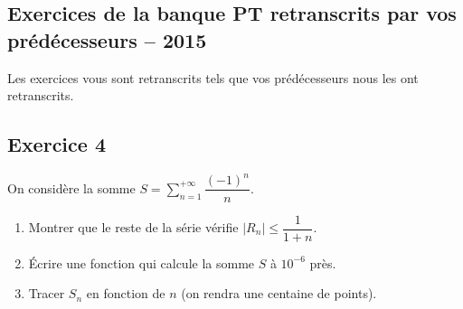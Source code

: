 \documentclass[10pt,fleqn]{article} %
\begin{document}
\newpage 
\begin{multicols}{2}


\section{Exercices de la banque PT retranscrits par vos prédécesseurs -- 2015}
\begin{rem}
Les exercices vous sont retranscrits tels que vos prédécesseurs nous les ont retranscrits. 
\end{rem}
%
%


\subsection*{Exercice 4}
On considère la somme $S=\sum\limits_{n=1}^{+\infty} \dfrac{(-1)^n}{n}$.
\begin{enumerate}
\item Montrer que le reste de la série vérifie $\left| R_n \right| \leq \dfrac{1}{1+n}$.
\item Écrire une fonction qui calcule la somme $S$ à $10^{-6}$ près.
\item Tracer $S_n$ en fonction de $n$ (on rendra une centaine de points).
\end{enumerate}


\end{multicols}
\end{document}
